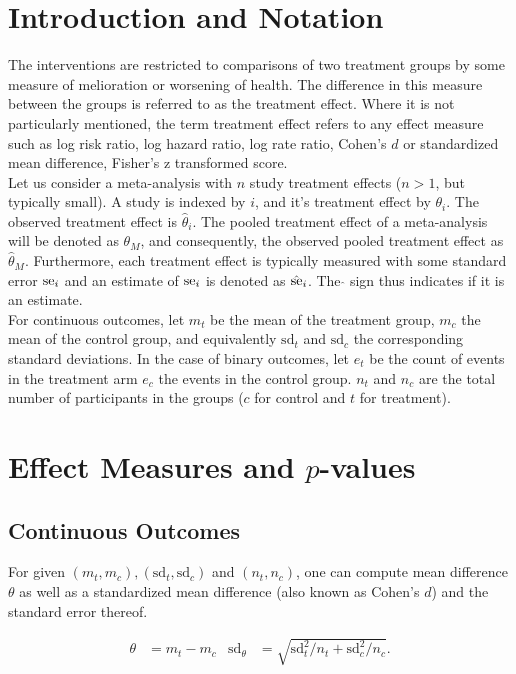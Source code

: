 \documentclass[11pt,a4paper,twoside]{book}\usepackage[]{graphicx}\usepackage[]{color}
\begin{document}
\section{Introduction and Notation}
The interventions are restricted to comparisons of two treatment groups by some measure of melioration or worsening of health. The difference in this measure between the groups is referred to as the treatment effect. Where it is not particularly mentioned, the term treatment effect refers to any effect measure such as log risk ratio, log hazard ratio, log rate ratio, Cohen's $d$ or standardized mean difference, Fisher's z transformed score.\\
Let us consider a meta-analysis with $n$ study treatment effects ($n > 1$, but typically small). A study is indexed by $i$, and it's treatment effect by  $\theta_i$. The observed treatment effect is $\hat{\theta}_i$. The pooled treatment effect of a meta-analysis will be denoted as $\theta_M$, and consequently, the observed pooled treatment effect as $\hat{\theta}_M$. Furthermore, each treatment effect is typically measured with some standard error $\operatorname{se}_i$ and an estimate of $\operatorname{se}_i$ is denoted as $\hat{\operatorname{se}}_i$. The $\hat{}$ sign thus indicates if it is an estimate.\\
For continuous outcomes, let $m_t$ be the mean of the treatment group, $m_c$ the mean of the control group, and equivalently $\textrm{sd}_t$ and $\textrm{sd}_c$ the corresponding standard deviations. 
In the case of binary outcomes, let $e_t$ be the count of events in the treatment arm $e_c$ the events in the control group. $n_t$ and $n_c$ are the total number of participants in the groups ($c$ for control and $t$ for treatment).%

\section{Effect Measures and $p$\hspace{0.4mm}-values}
\subsection{Continuous Outcomes}
For given $(m_t, m_c), (\textrm{sd}_t, \textrm{sd}_c)$ and $(n_t, n_c)$, one can compute mean difference $\theta$ as well as a standardized mean difference (also known as Cohen's $d$) and the standard error thereof.

\begin{align}
\theta &= m_t - m_c & \textrm{sd}_\theta &= \sqrt{\textrm{sd}_t^2/n_t + \textrm{sd}_c^2/n_c}.
\end{align}
\end{document}
